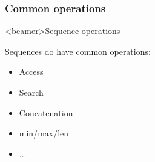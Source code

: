 \subsubsection{Common operations}

\begin{frame}<beamer>{Sequence operations}

  \begin{center}

    Sequences do have common operations:

    \begin{itemize}
      \item Access
      \item Search
      \item Concatenation
      \item min/max/len
      \item ...
    \end{itemize}

  \end{center}

\end{frame}


